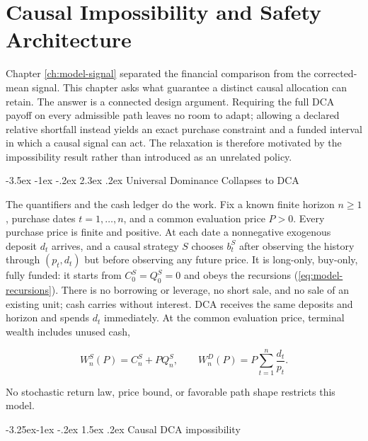 \documentclass[12pt,a4paper,oneside]{report}
\makeatletter
\renewcommand\section{\@startsection{section}{1}{\z@}%
  {-3.5ex \@plus -1ex \@minus -.2ex}%
  {2.3ex \@plus .2ex}%
  {\normalfont\fontsize{14}{17}\selectfont\bfseries}}
\renewcommand\subsection{\@startsection{subsection}{2}{\z@}%
  {-3.25ex\@plus -1ex \@minus -.2ex}%
  {1.5ex \@plus .2ex}%
  {\normalfont\fontsize{12}{15}\selectfont\bfseries}}
\makeatother
\begin{document}
\chapter{Causal Impossibility and Safety Architecture}
\label{ch:safety}

Chapter \ref{ch:model-signal} separated the financial comparison from the
corrected-mean signal. This chapter asks what guarantee a distinct causal
allocation can retain. The answer is a connected design argument. Requiring
the full DCA payoff on every admissible path leaves no room to adapt; allowing
a declared relative shortfall instead yields an exact purchase constraint and
a funded interval in which a causal signal can act. The relaxation is therefore
motivated by the impossibility result rather than introduced as an unrelated
policy.

\section{Universal Dominance Collapses to DCA}
\label{sec:dca-impossibility}

The quantifiers and the cash ledger do the work. Fix a known finite horizon
$n\geq1$, purchase dates $t=1,\ldots,n$, and a common evaluation price $P>0$.
Every purchase price is finite and positive. At each date a nonnegative
exogenous deposit $d_t$ arrives, and a causal strategy $S$ chooses $b_t^S$
after observing the history through $(p_t,d_t)$ but before observing any future
price. It is long-only, buy-only, fully funded: it starts from
$C_0^S=Q_0^S=0$ and obeys the recursions
(\ref{eq:model-recursions}). There is no borrowing or leverage, no short sale,
and no sale of an existing unit; cash carries without interest. DCA receives the same
deposits and horizon and spends $d_t$ immediately. At the common evaluation
price, terminal wealth includes unused cash,

\begin{equation}
  W_n^S(P)=C_n^S+P Q_n^S,
  \qquad
  W_n^D(P)=P\sum_{t=1}^{n}\frac{d_t}{p_t}.
  \label{eq:impossibility-wealth}
\end{equation}

No stochastic return law, price bound, or favorable path shape restricts this
model.

\subsection{Causal DCA impossibility}
\label{thm:dca-impossibility}
\end{document}
